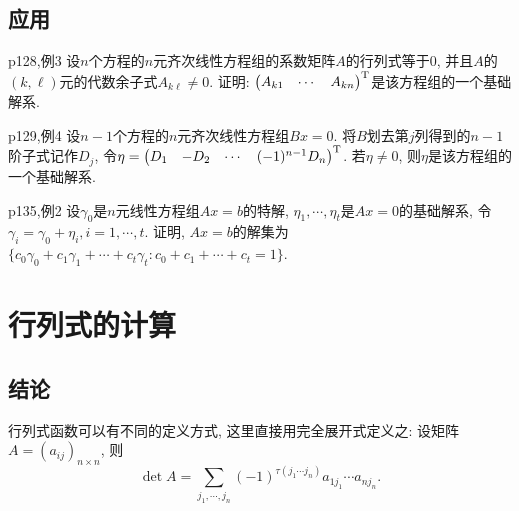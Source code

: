 \subsection*{应用}

\begin{example}{p128,例3}
	设$n$个方程的$n$元齐次线性方程组的系数矩阵$A$的行列式等于$0$, 并且$A$的$(k,\ell)$元的代数余子式$A_{k\ell} \neq 0$. 证明: $\begin{pmatrix}
		A_{k1} & \cdots & A_{kn}
	\end{pmatrix}^{\operatorname{T}}$是该方程组的一个基础解系. 
\end{example}

\begin{example}{p129,例4}
	设$n-1$个方程的$n$元齐次线性方程组$Bx=0$. 将$B$划去第$j$列得到的$n-1$阶子式记作$D_j$, 令$\eta = \begin{pmatrix}
		D_1 & -D_2 & \cdots & (-1)^{n-1}D_n
	\end{pmatrix}^{\operatorname{T}}$. 若$\eta \neq 0$, 则$\eta$是该方程组的一个基础解系. 
\end{example}

\begin{example}{p135,例2}
	设$\gamma _0$是$n$元线性方程组$Ax=b$的特解, $\eta _1,\cdots ,\eta _t$是$Ax=0$的基础解系, 令$\gamma _i=\gamma _0+\eta _i,i=1,\cdots ,t$. 证明, $Ax=b$的解集为$\{ c_0\gamma _0+c_1\gamma _1+\cdots + c_t\gamma _t:c_0+c_1+\cdots +c_t=1 \}$. 
\end{example}

\section{行列式的计算}

\subsection*{结论}

行列式函数可以有不同的定义方式, 这里直接用完全展开式定义之: 设矩阵$A=(a_{ij})_{n\times n}$, 则$$\det A = \sum_{j_1,\cdots ,j_n} (-1)^{\tau (j_1\cdots j_n)} a_{1j_1} \cdots a_{nj_n}. $$

